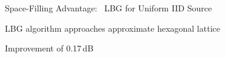 \begin{frame}{Space-Filling Advantage: ~LBG for Uniform IID Source}
\begin{minipage}[t]{0.5\linewidth}
\begin{center}
    \end{center}
  \end{minipage}

  \bit
\item\medskip LBG algorithm approaches approximate hexagonal lattice
\item[\iarrow]\smallskip Improvement of 0.17\,dB
  \eit
\end{frame}

